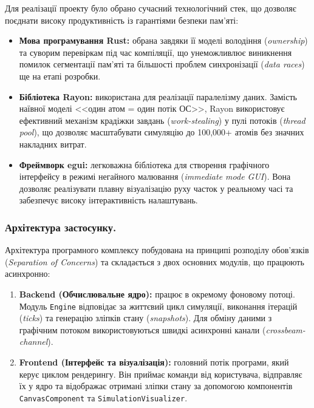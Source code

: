 \documentclass[14pt, a4paper]{extreport}
\begin{document}
	Для реалізації проекту було обрано сучасний технологічний стек, що дозволяє поєднати високу продуктивність із гарантіями безпеки пам'яті:
	
	\begin{itemize}
		\item \textbf{Мова програмування Rust:} обрана завдяки її моделі володіння (\textit{ownership}) та суворим перевіркам під час компіляції, що унеможливлює виникнення помилок сегментації пам'яті та більшості проблем синхронізації (\textit{data races}) ще на етапі розробки.
		
		\item \textbf{Бібліотека Rayon:} використана для реалізації паралелізму даних. Замість наївної моделі <<один атом = один потік ОС>>, Rayon використовує ефективний механізм крадіжки завдань (\textit{work-stealing}) у пулі потоків (\textit{thread pool}), що дозволяє масштабувати симуляцію до 100,000+ атомів без значних накладних витрат.
		
		\item \textbf{Фреймворк egui:} легковажна бібліотека для створення графічного інтерфейсу в режимі негайного малювання (\textit{immediate mode GUI}). Вона дозволяє реалізувати плавну візуалізацію руху часток у реальному часі та забезпечує високу інтерактивність налаштувань.
	\end{itemize}
	
	\subsubsection{Архітектура застосунку.}
	
	Архітектура програмного комплексу побудована на принципі розподілу обов'язків (\textit{Separation of Concerns}) та складається з двох основних модулів, що працюють асинхронно:
	
	\begin{enumerate}
		\item \textbf{Backend (Обчислювальне ядро):} працює в окремому фоновому потоці. Модуль \texttt{Engine} відповідає за життєвий цикл симуляції, виконання ітерацій (\textit{ticks}) та генерацію зліпків стану (\textit{snapshots}). Для обміну даними з графічним потоком використовуються швидкі асинхронні канали (\textit{crossbeam-channel}).
		
		\item \textbf{Frontend (Інтерфейс та візуалізація):} головний потік програми, який керує циклом рендерингу. Він приймає команди від користувача, відправляє їх у ядро та відображає отримані зліпки стану за допомогою компонентів \texttt{CanvasComponent} та \texttt{SimulationVisualizer}.
	\end{enumerate}
	
\end{document}

